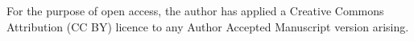 \documentclass[acmtacm,screen]{acmart}
\begin{document}
For the purpose of open access, the author has applied a Creative Commons Attribution (CC BY) licence to any Author Accepted Manuscript version arising.






\appendix
\end{document}
